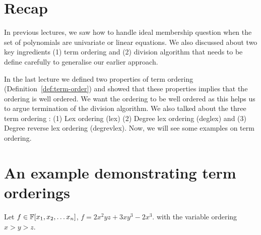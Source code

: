 
\section{Recap}
In previous lectures, we saw how to handle ideal membership question when the
set of polynomials are univariate or linear equations.  We also discussed
about two key ingredients (1) term ordering and (2) division algorithm that 
needs to be define carefully to generalise our earlier approach.

In the last lecture we defined two properties of term ordering
(Definition~\ref{def:term-order}) and showed that these properties 
implies that the ordering is well ordered. We want the ordering to be well
ordered as this helps us to argue termination of the division algorithm.  We 
also talked about the three term ordering : (1) Lex ordering (lex) (2) 
Degree lex ordering (deglex) and (3) Degree reverse lex ordering (degrevlex).
Now, we will see some examples on term ordering.

\section{An example demonstrating term orderings}

Let $f \in {\mathbb{F}[x_1,x_2, \ldots x_n]}$, $f = 2x^2yz + 3xy^3 - 2x^3$. with the variable ordering
$x>y>z$.

